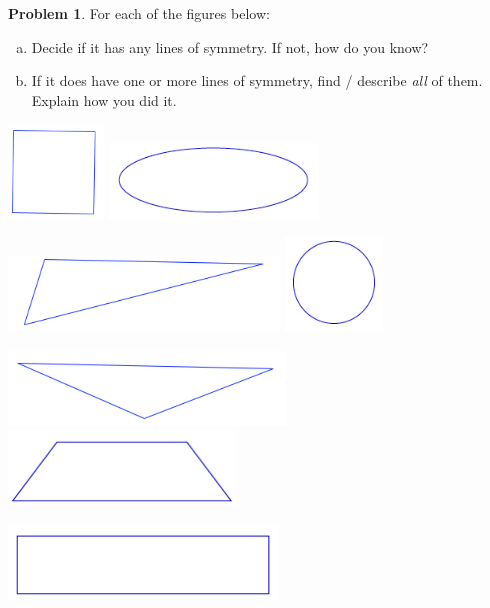 \documentclass[12pt, reqno]{amsart}
\theoremstyle{remark}
\theoremstyle{definition}
\newtheorem{problem}{Problem}
\numberwithin{equation}{section}  %
\begin{document}
\begin{problem}
For each of the figures below:
\begin{enumerate}[(a)]
\item
Decide if it has any lines of symmetry.  If not, how do you know?\\
\item
If it does have one or more lines of symmetry, find / describe \emph{all} of them.    Explain how you did it.\\
\end{enumerate}

\begin{center}
\includegraphics[height=2.5cm]{smsq}
\qquad \qquad
\includegraphics[height=2cm]{ellipse}

\bigskip

\includegraphics[height=2cm]{scatri}
\qquad \qquad
\includegraphics[height=2.5cm]{circle}

\bigskip

\includegraphics[height=2cm]{scaltri}
\includegraphics[height=2cm]{trap1}


\bigskip

\includegraphics[height=2cm]{rect}


\end{center}

\end{problem}
\end{document}
